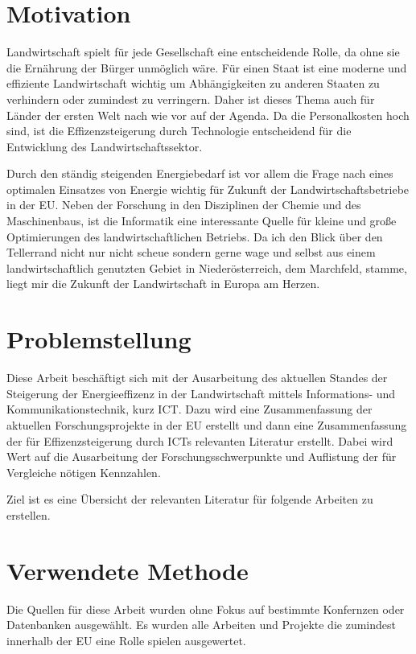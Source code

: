 \section{Motivation}

Landwirtschaft spielt für jede Gesellschaft eine entscheidende Rolle, da ohne sie die Ernährung der Bürger unmöglich wäre. Für einen Staat ist eine moderne und effiziente Landwirtschaft wichtig um Abhängigkeiten zu anderen Staaten zu verhindern oder zumindest zu verringern. Daher ist dieses Thema auch für Länder der ersten Welt nach wie vor auf der Agenda. Da die Personalkosten hoch sind, ist die Effizenzsteigerung durch Technologie entscheidend für die Entwicklung des Landwirtschaftssektor.

Durch den ständig steigenden Energiebedarf ist vor allem die Frage nach eines optimalen Einsatzes von Energie wichtig für Zukunft der Landwirtschaftsbetriebe in der EU. Neben der Forschung in den Disziplinen der Chemie und des Maschinenbaus, ist die Informatik eine interessante Quelle für kleine und große Optimierungen des landwirtschaftlichen Betriebs. Da ich den Blick über den Tellerrand nicht nur nicht scheue sondern gerne wage und selbst aus einem landwirtschaftlich genutzten Gebiet in Niederösterreich, dem Marchfeld, stamme, liegt mir die Zukunft der Landwirtschaft in Europa am Herzen.

\section{Problemstellung}

Diese Arbeit beschäftigt sich mit der Ausarbeitung des aktuellen Standes der Steigerung der Energieeffizenz in der Landwirtschaft mittels Informations- und Kommunikationstechnik, kurz ICT. Dazu wird eine Zusammenfassung der aktuellen Forschungsprojekte in der EU erstellt und dann eine Zusammenfassung der für Effizenzsteigerung durch ICTs relevanten Literatur erstellt. Dabei wird Wert auf die Ausarbeitung der Forschungsschwerpunkte und Auflistung der für Vergleiche nötigen Kennzahlen. 

Ziel ist es eine Übersicht der relevanten Literatur für folgende Arbeiten zu erstellen.

\section{Verwendete Methode}

Die Quellen für diese Arbeit wurden ohne Fokus auf bestimmte Konfernzen oder Datenbanken ausgewählt. Es wurden alle Arbeiten und Projekte die zumindest innerhalb der EU eine Rolle spielen ausgewertet.

